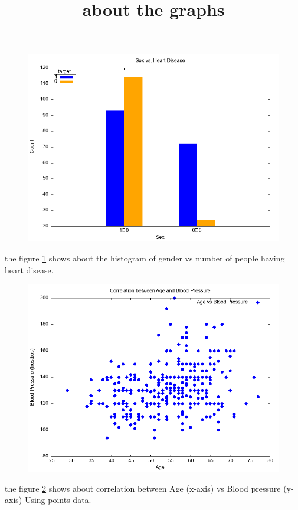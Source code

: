 \documentclass{article}
\title{about the graphs}
\date{}
\begin{document}
	\maketitle
	\begin{figure}[H]
		\includegraphics[width=\textwidth]{4a.png}
		\label{fig:gender vs number}
	\end{figure}
	the figure \ref{fig:gender vs number} shows about the histogram of gender vs number of people having heart disease. 
	\begin{figure}[H]
		\includegraphics[width=\textwidth]{4b.png}
		\label{fig: Age  vs Blood pressure}
	\end{figure}
	the figure \ref{fig: Age  vs Blood pressure} shows about correlation between Age (x-axis) vs Blood pressure (y-axis) Using points data.
\end{document}

